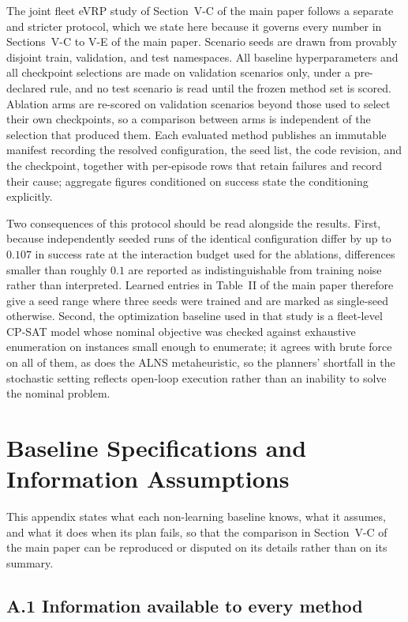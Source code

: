 \documentclass[journal]{IEEEtran}
\begin{document}
The joint fleet eVRP study of Section~V-C of the main paper follows a separate and stricter protocol, which we state here because it governs every number in Sections~V-C to V-E of the main paper. Scenario seeds are drawn from provably disjoint train, validation, and test namespaces. All baseline hyperparameters and all checkpoint selections are made on validation scenarios only, under a pre-declared rule, and no test scenario is read until the frozen method set is scored. Ablation arms are re-scored on validation scenarios beyond those used to select their own checkpoints, so a comparison between arms is independent of the selection that produced them. Each evaluated method publishes an immutable manifest recording the resolved configuration, the seed list, the code revision, and the checkpoint, together with per-episode rows that retain failures and record their cause; aggregate figures conditioned on success state the conditioning explicitly.

Two consequences of this protocol should be read alongside the results. First, because independently seeded runs of the identical configuration differ by up to $0.107$ in success rate at the interaction budget used for the ablations, differences smaller than roughly $0.1$ are reported as indistinguishable from training noise rather than interpreted. Learned entries in Table~II of the main paper therefore give a seed range where three seeds were trained and are marked as single-seed otherwise. Second, the optimization baseline used in that study is a fleet-level CP-SAT model whose nominal objective was checked against exhaustive enumeration on instances small enough to enumerate; it agrees with brute force on all of them, as does the ALNS metaheuristic, so the planners' shortfall in the stochastic setting reflects open-loop execution rather than an inability to solve the nominal problem.

\section{Baseline Specifications and Information Assumptions}\label{app:baselines}

This appendix states what each non-learning baseline knows, what it assumes, and
what it does when its plan fails, so that the comparison in
Section~V-C of the main paper can be reproduced or disputed on its details rather
than on its summary.

\subsection*{A.1 Information available to every method}
\end{document}
